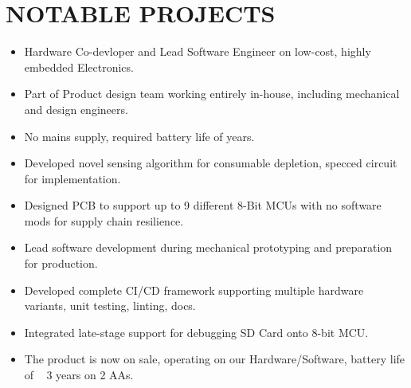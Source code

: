 

\section{NOTABLE PROJECTS}
\vspace{-4mm}

{
  {\begin{itemize}
    \item Hardware Co-devloper and Lead Software Engineer on low-cost, highly embedded Electronics.
    \item Part of Product design team working entirely in-house, including mechanical and design engineers.
    \item No mains supply, required battery life of years. 
    \item Developed novel sensing algorithm for consumable depletion, specced circuit for implementation. 
    \item Designed PCB to support up to 9 different 8-Bit MCUs with no software mods for supply chain resilience.
    \item Lead software development during mechanical prototyping and preparation for production. 
    \item Developed complete CI/CD framework supporting multiple hardware variants, unit testing, linting, docs. 
    \item Integrated late-stage support for debugging SD Card onto 8-bit MCU. 
    \item The product is now on sale, operating on our Hardware/Software, battery life of ~ 3 years on 2 AAs. 
  \end{itemize} 
  }
}

